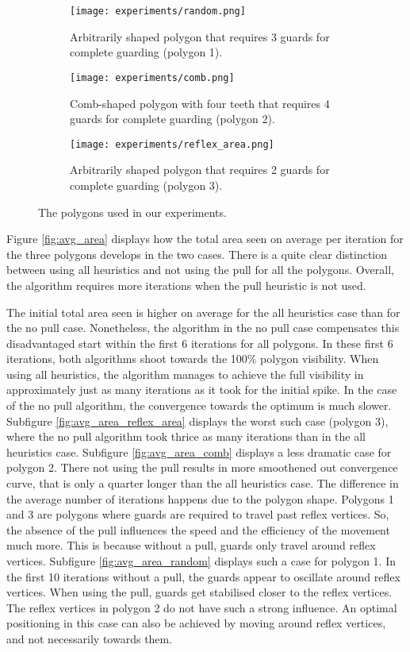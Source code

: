 \begin{figure}[h!]
    \centering
    \begin{subfigure}{0.3\textwidth}
        \texttt{[image: experiments/random.png]}
        \caption{Arbitrarily shaped polygon that requires 3 guards for complete guarding (polygon 1).}
    \end{subfigure}
    \hfill
    \begin{subfigure}{0.3\textwidth}
        \texttt{[image: experiments/comb.png]}
        \caption{Comb-shaped polygon with four teeth that requires 4 guards for complete guarding (polygon 2).}
    \end{subfigure}
    \hfill
    \begin{subfigure}{0.3\textwidth}
        \texttt{[image: experiments/reflex\_area.png]}
        \caption{Arbitrarily shaped polygon that requires 2 guards for complete guarding (polygon 3).}
    \end{subfigure}
    \caption{The polygons used in our experiments.}
    \label{fig:polygons}
\end{figure}

Figure \ref{fig:avg_area} displays how the total area seen on average per iteration for the three polygons develops in the two cases. There is a quite clear distinction between using all heuristics and not using the pull for all the polygons. Overall, the algorithm requires more iterations when the pull heuristic is not used. 

The initial total area seen is higher on average for the all heuristics case than for the no pull case. Nonetheless, the algorithm in the no pull case compensates this disadvantaged start within the first 6 iterations for all polygons. In these first 6 iterations, both algorithms shoot towards the 100\% polygon visibility. When using all heuristics, the algorithm manages to achieve the full visibility in approximately just as many iterations as it took for the initial spike. In the case of the no pull algorithm, the convergence towards the optimum is much slower. 
Subfigure \ref{fig:avg_area_reflex_area} displays the worst such case (polygon 3), where the no pull algorithm took thrice as many iterations than in the all heuristics case. Subfigure \ref{fig:avg_area_comb} displays a less dramatic case for polygon 2. There not using the pull results in more smoothened out convergence curve, that is only a quarter longer than the all heuristics case. 
The difference in the average number of iterations happens due to the polygon shape. Polygons 1 and 3 are polygons where guards are required to travel past reflex vertices. So, the absence of the pull influences the speed and the efficiency of the movement much more. This is because without a pull, guards only travel around reflex vertices. Subfigure \ref{fig:avg_area_random} displays such a case for polygon 1. In the first 10 iterations without a pull, the guards appear to oscillate around reflex vertices. When using the pull, guards get stabilised closer to the reflex vertices. The reflex vertices in polygon 2 do not have such a strong influence. An optimal positioning in this case can also be achieved by moving around reflex vertices, and not necessarily towards them. 

